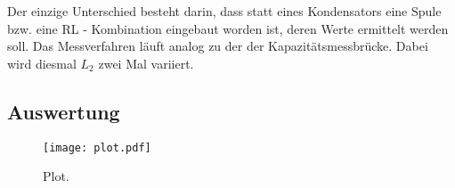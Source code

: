 Der einzige Unterschied besteht darin, dass statt eines Kondensators
eine Spule bzw. eine RL - Kombination eingebaut worden ist, deren 
Werte ermittelt werden soll. Das Messverfahren läuft analog zu der
der Kapazitätsmessbrücke. Dabei wird diesmal $L_2$ zwei Mal variiert. 

\subsection{Auswertung}
\label{subsec:Auswertung}

\begin{figure}
  \centering
  \texttt{[image: plot.pdf]}
  \caption{Plot.}
  \label{fig:plot}
\end{figure}